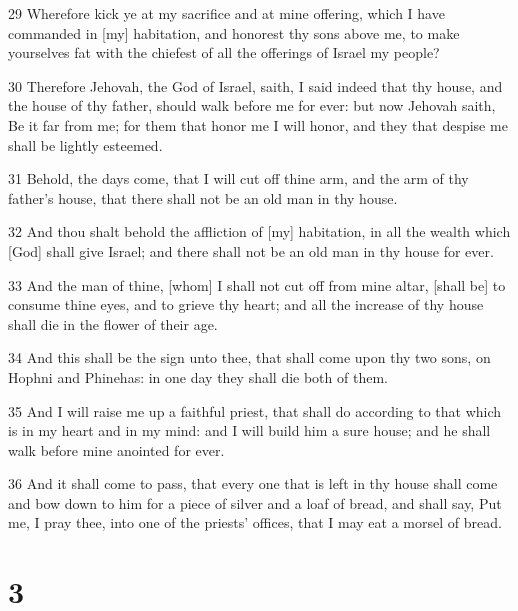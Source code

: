 \par 29 Wherefore kick ye at my sacrifice and at mine offering, which I have commanded in [my] habitation, and honorest thy sons above me, to make yourselves fat with the chiefest of all the offerings of Israel my people?
\par 30 Therefore Jehovah, the God of Israel, saith, I said indeed that thy house, and the house of thy father, should walk before me for ever: but now Jehovah saith, Be it far from me; for them that honor me I will honor, and they that despise me shall be lightly esteemed.
\par 31 Behold, the days come, that I will cut off thine arm, and the arm of thy father's house, that there shall not be an old man in thy house.
\par 32 And thou shalt behold the affliction of [my] habitation, in all the wealth which [God] shall give Israel; and there shall not be an old man in thy house for ever.
\par 33 And the man of thine, [whom] I shall not cut off from mine altar, [shall be] to consume thine eyes, and to grieve thy heart; and all the increase of thy house shall die in the flower of their age.
\par 34 And this shall be the sign unto thee, that shall come upon thy two sons, on Hophni and Phinehas: in one day they shall die both of them.
\par 35 And I will raise me up a faithful priest, that shall do according to that which is in my heart and in my mind: and I will build him a sure house; and he shall walk before mine anointed for ever.
\par 36 And it shall come to pass, that every one that is left in thy house shall come and bow down to him for a piece of silver and a loaf of bread, and shall say, Put me, I pray thee, into one of the priests' offices, that I may eat a morsel of bread.

\chapter{3}


